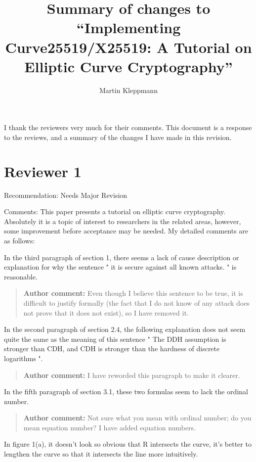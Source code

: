 \documentclass[10pt]{article}
\newcommand{\authorcomment}[1]{\begin{quote}\textbf{Author comment:} #1\end{quote}}
\begin{document}
\title{Summary of changes to ``Implementing Curve25519/X25519: A Tutorial on Elliptic Curve Cryptography''}
\author{Martin Kleppmann}
\date{}
\maketitle

I thank the reviewers very much for their comments.
This document is a response to the reviews, and a summary of the changes I have made in this revision.

\section{Reviewer 1}

\begin{spverbatim}
Recommendation: Needs Major Revision

Comments:
This paper presents a tutorial on elliptic curve cryptography. Absolutely it is a topic of interest to researchers in the related areas, however, some improvement before acceptance may be needed. My detailed comments are as follows:

In the third paragraph of section 1, there seems a lack of cause description or explanation for why the sentence " it is secure against all known attacks. " is reasonable.
\end{spverbatim}
\authorcomment{Even though I believe this sentence to be true, it is difficult to justify formally (the fact that I do not know of any attack does not prove that it does not exist), so I have removed it.}
\begin{spverbatim}
In the second paragraph of section 2.4, the following explanation does not seem quite the same as the meaning of this sentence " The DDH assumption is stronger than CDH, and CDH is stronger than the hardness of discrete logarithms ".
\end{spverbatim}
\authorcomment{I have reworded this paragraph to make it clearer.}
\begin{spverbatim}
In the fifth paragraph of section 3.1, these two formulas seem to lack the ordinal number.
\end{spverbatim}
\authorcomment{Not sure what you mean with ordinal number; do you mean equation number? I have added equation numbers.}
\begin{spverbatim}
In figure 1(a), it doesn't look so obvious that R intersects the curve, it's better to lengthen the curve so that it intersects the line more intuitively.
\end{spverbatim}
\end{document}
